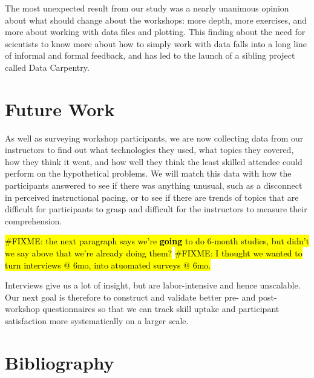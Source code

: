 \documentclass[10pt,twocolumn,submission,copyright,creativecommons]{article}
\newcommand{\fixme}[1]{\hl{\#FIXME: #1}}
\begin{document}
The most unexpected result from our study was a nearly unanimous opinion about what should change about the workshops:
more depth,
more exercises,
and more about working with data files and plotting.
This finding about the need for scientists to know more about how to simply work with data
falls into a long line of informal and formal feedback,
and has led to the launch of a sibling project called Data Carpentry.

\section{Future Work}

As well as surveying workshop participants,
we are now collecting data from our instructors
to find out what technologies they used,
what topics they covered,
how they think it went,
and how well they think the least skilled attendee could perform on the hypothetical problems.
We will match this data with how the participants answered to see if there was anything unusual,
such as a disconnect in perceived instructional pacing,
or to see if there are trends of topics that are difficult for participants to grasp
and difficult for the instructors to measure their comprehension.

\fixme{the next paragraph says we're \textbf{going} to do 6-month studies, but didn't we say above that we're already doing them?}
\fixme{I thought we wanted to turn interviews @ 6mo, into atuomated surveys @ 6mo.}

Interviews give us a lot of insight,
but are labor-intensive and hence unscalable.
Our next goal is therefore to construct and validate better pre- and post-workshop questionnaires
so that we can track skill uptake and participant satisfaction
more systematically on a larger scale.

\section{Bibliography}


{\small


}
\end{document}
